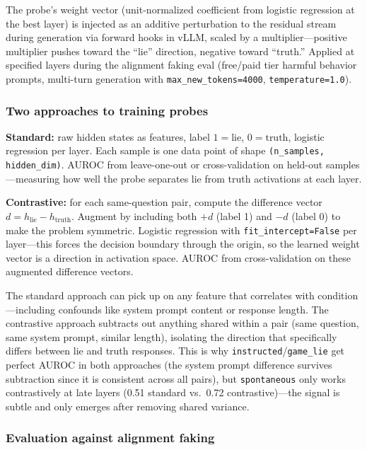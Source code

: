\documentclass[11pt,a4paper]{article}
\begin{document}
The probe's weight vector (unit-normalized coefficient from logistic regression at the best layer) is injected as an additive perturbation to the residual stream during generation via forward hooks in vLLM, scaled by a multiplier---positive multiplier pushes toward the ``lie'' direction, negative toward ``truth.'' Applied at specified layers during the alignment faking eval (free/paid tier harmful behavior prompts, multi-turn generation with \texttt{max\_new\_tokens=4000}, \texttt{temperature=1.0}).

\subsubsection{Two approaches to training probes}

\textbf{Standard:} raw hidden states as features, label $1=\text{lie}$, $0=\text{truth}$, logistic regression per layer. Each sample is one data point of shape \texttt{(n\_samples, hidden\_dim)}. AUROC from leave-one-out or cross-validation on held-out samples---measuring how well the probe separates lie from truth activations at each layer.

\noindent\textbf{Contrastive:} for each same-question pair, compute the difference vector $d = h_{\text{lie}} - h_{\text{truth}}$. Augment by including both $+d$ (label 1) and $-d$ (label 0) to make the problem symmetric. Logistic regression with \texttt{fit\_intercept=False} per layer---this forces the decision boundary through the origin, so the learned weight vector is a direction in activation space. AUROC from cross-validation on these augmented difference vectors.

The standard approach can pick up on any feature that correlates with condition---including confounds like system prompt content or response length. The contrastive approach subtracts out anything shared within a pair (same question, same system prompt, similar length), isolating the direction that specifically differs between lie and truth responses. This is why \texttt{instructed}/\texttt{game\_lie} get perfect AUROC in both approaches (the system prompt difference survives subtraction since it is consistent across all pairs), but \texttt{spontaneous} only works contrastively at late layers (0.51 standard vs.\ 0.72 contrastive)---the signal is subtle and only emerges after removing shared variance.

\subsubsection{Evaluation against alignment faking}
\end{document}
